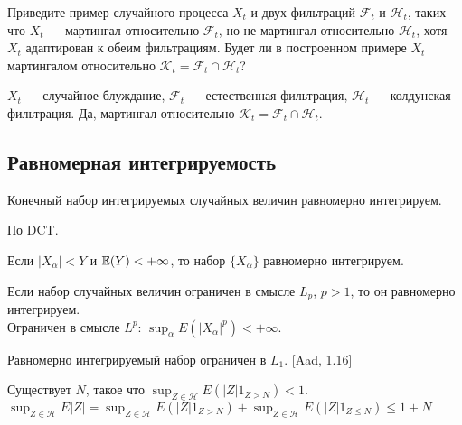 \begin{problem}
Приведите пример случайного процесса $X_t$ и двух фильтраций $\mathcal{F}_t$ и $\mathcal{H}_t$, таких что $X_t$ — мартингал относительно $\mathcal{F}_t$, но не мартингал относительно $\mathcal{H}_t$, хотя $X_t$ адаптирован к обеим фильтрациям. Будет ли в построенном примере $X_t$ мартингалом относительно $\mathcal{K}_t=\mathcal{F}_t \cap \mathcal{H}_t$?


\begin{sol}

$X_t$ — случайное блуждание, $\mathcal{F}_t$ — естественная фильтрация, $\mathcal{H}_t$ — колдунская фильтрация. Да, мартингал относительно $\mathcal{K}_t=\mathcal{F}_t \cap \mathcal{H}_t$.
\end{sol}
\end{problem}



\subsection{Равномерная интегрируемость}

\begin{problem}
Конечный набор интегрируемых случайных величин равномерно
интегрируем.

\begin{sol}
 По DCT.
\end{sol}
\end{problem}

\begin{problem}
Если $|X_{\alpha}|<Y$ и $\mathbb{E}(Y)<+\infty$, то набор $\{X_{\alpha}\}$
равномерно интегрируем.

\begin{sol}

\end{sol}
\end{problem}

\begin{problem}
Если набор случайных величин ограничен в смысле $L_{p}$,
$p>1$, то он равномерно интегрируем. \\
Ограничен в смысле $L^{p}$:
$\sup_{\alpha}E\left(|X_{\alpha}|^{p}\right)<+\infty$.

\begin{sol}

\end{sol}
\end{problem}

\begin{problem}
Равномерно интегрируемый набор ограничен в $L_{1}$. [Aad, 1.16]

\begin{sol}

Существует $N$, такое что $\sup_{Z\in \mathcal{H}}E
\left(|Z|1_{Z>N} \right)<1$. \\
$\sup_{Z\in \mathcal{H}}E |Z|=\sup_{Z\in \mathcal{H}}E
\left(|Z|1_{Z>N} \right)+\sup_{Z\in \mathcal{H}}E \left(|Z|1_{Z\le
N} \right)\le
1+N$
\end{sol}
\end{problem}

